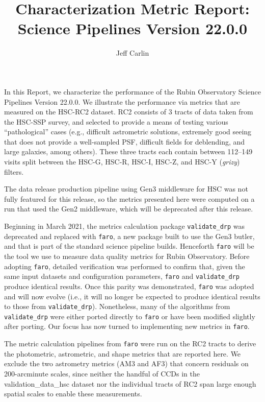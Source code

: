 \documentclass[DM, lsstdraft, toc]{lsstdoc}
\title{Characterization Metric Report: Science Pipelines Version 22.0.0}
\author{Jeff Carlin}
\date{\vcsDate}
\begin{document}
\maketitle

In this Report, we characterize the performance of the Rubin Observatory Science Pipelines Version 22.0.0. We illustrate the performance via metrics that are measured on the HSC-RC2 dataset. RC2 consists of 3 tracts of data taken from the HSC-SSP survey, and selected to provide a means of testing various ``pathological'' cases (e.g., difficult astrometric solutions, extremely good seeing that does not provide a well-sampled PSF, difficult fields for deblending, and large galaxies, among others). These three tracts each contain between 112--149 visits split between the HSC-G, HSC-R, HSC-I, HSC-Z, and HSC-Y (\emph{grizy}) filters. 

The data release production pipeline using Gen3 middleware for HSC was not fully featured for this release, so the metrics presented here were computed on a run that used the Gen2 middleware, which will be deprecated after this release.

Beginning in March 2021, the metrics calculation package \texttt{validate\_drp} was deprecated and replaced with \texttt{faro}, a new package built to use the Gen3 butler, and that is part of the standard science pipeline builds. Henceforth \texttt{faro} will be the tool we use to measure data quality metrics for Rubin Observatory. Before adopting \texttt{faro}, detailed verification was performed to confirm that, given the same input datasets and configuration parameters, \texttt{faro} and \texttt{validate\_drp} produce identical results. Once this parity was demonstrated, \texttt{faro} was adopted and will now evolve (i.e., it will no longer be expected to produce identical results to those from \texttt{validate\_drp}). Nonetheless, many of the algorithms from \texttt{validate\_drp} were either ported directly to \texttt{faro} or have been modified slightly after porting. Our focus has now turned to implementing new metrics in \texttt{faro}.

The metric calculation pipelines from \texttt{faro} were run on the RC2 tracts to derive the photometric, astrometric, and shape metrics that are reported here. We exclude the two astrometry metrics (AM3 and AF3) that concern residuals on 200-arcminute scales, since neither the handful of CCDs in the validation\_data\_hsc dataset nor the individual tracts of RC2 span large enough spatial scales to enable these measurements. 
\end{document}

